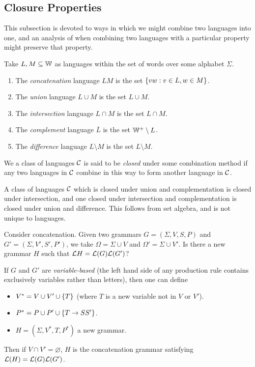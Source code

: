 \documentclass{article}
\begin{document}
\subsection{Closure Properties}

This subsection is devoted to ways in which we might combine two languages into one, and an analysis of when combining two languages with a particular property might preserve that property.

Take $L, M \subseteq \mathbb{W}$ as languages within the set of words over some alphabet $\Sigma$.

\begin{enumerate}
	\item The \textit{concatenation} language $LM$ is the set $\left\lbrace vw: v \in L, w \in M \right\rbrace$.
	\item The \textit{union} language $L \cup M$ is the set $L \cup M$.
	\item The \textit{intersection} language $L \cap M$ is the set $L \cap M$.
	\item The \textit{complement} language $\overline L$ is the set $\mathbb{W}^+ \setminus L$.
	\item The \textit{difference} language $L \setminus M$ is the set $L \setminus M$.
\end{enumerate}

\begin{note}
	We a class of languages $\mathcal{C}$ is said to be \textit{closed} under some combination method if any two languages in $\mathcal{C}$ combine in this way to form another language in $\mathcal{C}$.
\end{note}

\begin{note}
	A class of languages $\mathcal{C}$ which is closed under union and complementation is closed under intersection, and one closed under intersection and complementation is closed under union and difference. This follows from set algebra, and is not unique to languages.
\end{note}

Consider concatenation. Given two grammars $G = (\Sigma, V, S, P)$ and $G' = (\Sigma, V', S', P')$, we take $\Omega = \Sigma \cup V$ and $\Omega' = \Sigma \cup V'$. Is there a new grammar $H$ such that $\mathcal{L}{H} = \mathcal{L}(G)\mathcal{L}(G')$?

\begin{proposition}
	\label{concatenation-grammar}
	If $G$ and $G'$ are \textit{variable-based} (the left hand side of any production rule contains exclusively variables rather than letters), then one can define
	\begin{itemize}
		\item $V^* = V \cup V' \cup \left\lbrace T \right\rbrace$ (where $T$ is a new variable not in $V$ or $V'$).
		\item $P^* = P \cup P' \cup \left\lbrace T \to SS' \right\rbrace$.
		\item $H = (\Sigma, V^*, T, P^*)$ a new grammar.
	\end{itemize}
	Then if $V \cap V' = \varnothing$, $H$ is the concatenation grammar satisfying $\mathcal{L}(H) = \mathcal{L}(G)\mathcal{L}(G')$.
\end{proposition}
\end{document}
